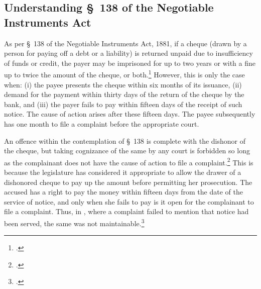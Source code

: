 \documentclass[12pt,a4paper]{article}
\begin{document}
	\newpage
	\printbibliography[heading=bibintoc]
	
	\newpage
	\begin{appendices}
		
		\section{Understanding \S~138 of the Negotiable Instruments Act} \label{app:understanding}
		
		As per \S~138 of the Negotiable Instruments Act, 1881, if a cheque (drawn by a person for paying off a debt or a liability) is returned unpaid due to insufficiency of funds or credit, the payer may be imprisoned for up to two years or with a fine up to twice the amount of the cheque, or both.\footcite[A \textit{cheque} is defined as per \S~6 of the NI Act. It is a bill of exchange drawn on a specified banker and not expressed to be payable otherwise than on-demand. It includes the electronic image of a truncated cheque and a cheque in electronic form. Once a cheque has been signed and issued in favor of the holder of the cheque, there is a statutory presumption \S~139 of the NI Act that the cheque is issued in discharge of a legally enforceable debt or liability. However, said presumption is a rebuttable one. The issuer of the cheque can rebut that presumption by adducing credible evidence that the cheque was issued for some other purpose like security for a loan.][]{sc2018_murugun} However, this is only the case when: (i) the payee presents the cheque within six months of its issuance, (ii) demand for the payment within thirty days of the return of the cheque by the bank, and (iii) the payer fails to pay within fifteen days of the receipt of such notice. The cause of action arises after these fifteen days. The payee subsequently has one month to file a complaint before the appropriate court.
		
		An offence within the contemplation of \S~138 is complete with the dishonor of the cheque, but taking cognizance of the same by any court is forbidden so long as the complainant does not have the cause of action to file a complaint.\footcite{sc2014_dashrath} This is because the legislature has considered it appropriate to allow the drawer of a dishonored cheque to pay up the amount before permitting her prosecution. The accused has a right to pay the money within fifteen days from the date of the service of notice, and only when she fails to pay is it open for the complainant to file a complaint. Thus, in , where a complaint failed to mention that notice had been served, the same was not maintainable.\footcite{sc2002_shakti}
		

\end{appendices}
\end{document}
